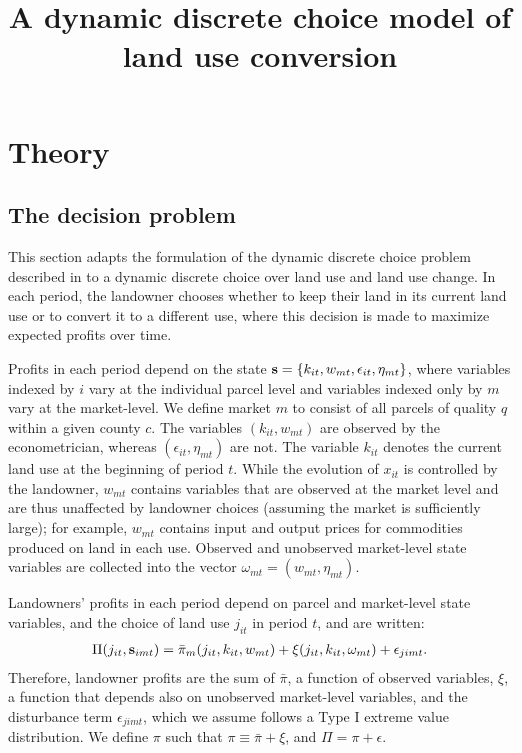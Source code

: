\documentclass[11pt]{article}
\begin{document}
\title{{\bf A dynamic discrete choice model of land use conversion}}


\maketitle

\section{Theory}

\subsection{The decision problem}

This section adapts the formulation of the dynamic discrete choice problem described in \citet{kalouptsidi2020} to a dynamic discrete choice over land use and land use change. In each period, the landowner chooses whether to keep their land in its current land use or to convert it to a different use, where this decision is made to maximize expected profits over time. 

Profits in each period depend on the state ${\bf s} = \{k_{it},w_{mt},\epsilon_{it},\eta_{mt}\}$, where variables indexed by $i$ vary at the individual parcel level and variables indexed only by $m$ vary at the market-level. We define market $m$ to consist of all parcels of quality $q$ within a given county $c$. The variables $(k_{it},w_{mt})$ are observed by the econometrician, whereas $(\epsilon_{it},\eta_{mt})$ are not. The variable $k_{it}$ denotes the current land use at the beginning of period $t$. While the evolution of $x_{it}$ is controlled by the landowner, $w_{mt}$ contains variables that are observed at the market level and are thus unaffected by landowner choices (assuming the market is sufficiently large); for example, $w_{mt}$ contains input and output prices for commodities produced on land in each use. Observed and unobserved market-level state variables are collected into the vector $\omega_{mt} = (w_{mt},\eta_{mt})$. 

Landowners' profits in each period depend on parcel and market-level state variables, and the choice of land use $j_{it}$ in period $t$, and are written:
\begin{align}
\Pi(j_{it},{\bf s}_{imt}) = \bar{\pi}_m(j_{it},k_{it},w_{mt}) + \xi(j_{it},k_{it},\omega_{mt}) + \epsilon_{jimt}.
\end{align}
Therefore, landowner profits are the sum of $\bar{\pi}$, a function of observed variables, $\xi$, a function that depends also on unobserved market-level variables, and the disturbance term $\epsilon_{jimt}$, which we assume follows a Type I extreme value distribution. We define $\pi$ such that $\pi \equiv \bar{\pi} + \xi$, and $\Pi = \pi + \epsilon$.
\end{document}
